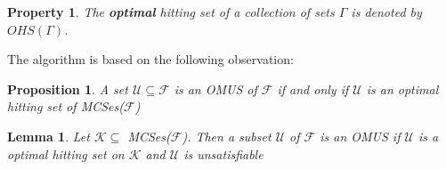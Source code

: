 \documentclass{article}
\newcommand\m[1]{\mathcal{#1}}
\newtheorem{property}[prop]{Property}
\newtheorem{lemma}[lem]{Lemma}
\newtheorem{proposition}[propo]{Proposition}
\begin{document}
\begin{property}
  The \textbf{optimal} hitting set of a collection of sets $\Gamma$ is denoted by $OHS(\Gamma)$.
\end{property}

The algorithm is based on the following observation:

\begin{proposition}\label{prop:optimal-hitting-set}
  A set $\m{U} \subseteq \m{F}$ is an OMUS of $\m{F}$ if and only if $\m{U}$ is an optimal hitting set of MCSes($\m{F}$)
\end{proposition}

\begin{lemma}\label{lemma:K}
  Let $\m{K}  \subseteq$ MCSes($\m{F}$). Then a subset $\m{U}$ of $\m{F}$ is an OMUS if $\m{U}$ is a optimal hitting set on $\m{K}$ and $\m{U}$ is unsatisfiable
\end{lemma}
\end{document}
